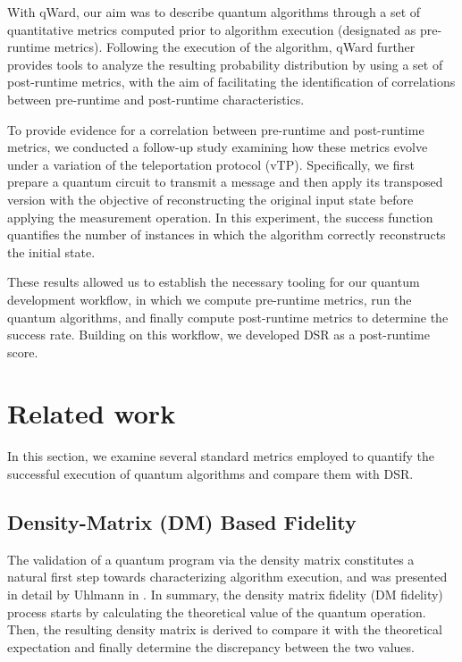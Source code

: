 \documentclass[pdflatex,sn-mathphys-num]{sn-jnl}
\theoremstyle{thmstyleone}%
\theoremstyle{thmstyletwo}%
\theoremstyle{thmstylethree}%
\begin{document}
With qWard, our aim was to describe quantum algorithms through a set of quantitative metrics computed prior to algorithm execution (designated as pre-runtime metrics). Following the execution of the algorithm, qWard further provides tools to analyze the resulting probability distribution by using a set of post-runtime metrics, with the aim of facilitating the identification of correlations between pre-runtime and post-runtime characteristics.

To provide evidence for a correlation between pre-runtime and post-runtime metrics, we conducted a follow-up study examining how these metrics evolve under a variation of the teleportation protocol (vTP). Specifically, we first prepare a quantum circuit to transmit a message and then apply its transposed version with the objective of reconstructing the original input state before applying the measurement operation. In this experiment, the success function quantifies the number of instances in which the algorithm correctly reconstructs the initial state.

These results allowed us to establish the necessary tooling for our quantum development workflow, in which we compute pre-runtime metrics, run the quantum algorithms, and finally compute post-runtime metrics to determine the success rate. Building on this workflow, we developed DSR as a post-runtime score.

\FloatBarrier
\section{Related work}\label{sec:related-work}

In this section, we examine several standard metrics employed to quantify the successful execution of quantum algorithms and compare them with DSR.

\subsection{Density-Matrix (DM) Based Fidelity}\label{sec:density-matrix}

The validation of a quantum program via the density matrix constitutes a natural first step towards characterizing algorithm execution, and was presented in detail by Uhlmann in \cite{UHLMANN1976273_1976}. In summary, the density matrix fidelity (DM fidelity) process starts by calculating the theoretical value of the quantum operation. Then, the resulting density matrix is derived to compare it with the theoretical expectation and finally determine the discrepancy between the two values.
\end{document}
